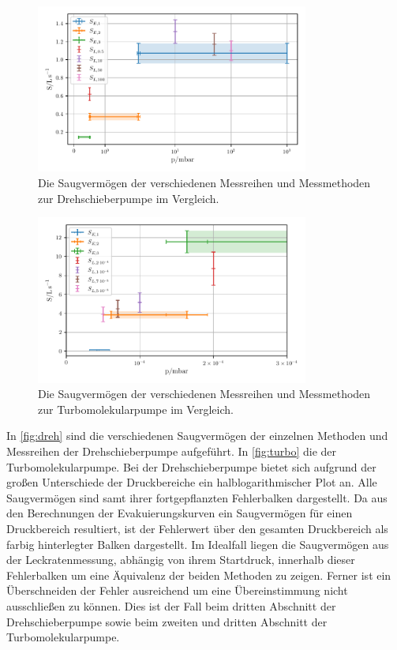 \begin{figure}
    \centering
    \includegraphics[width=0.8\textwidth]{abb/plot1.pdf}
    \caption{Die Saugvermögen der verschiedenen Messreihen und Messmethoden zur Drehschieberpumpe im Vergleich.}
    \label{fig:dreh}
\end{figure}
\begin{figure}
    \centering
    \includegraphics[width=0.8\textwidth]{abb/plot2.pdf}
    \caption{Die Saugvermögen der verschiedenen Messreihen und Messmethoden zur Turbomolekularpumpe im Vergleich.}
    \label{fig:turbo}
\end{figure}
In \autoref{fig:dreh} sind die verschiedenen Saugvermögen der einzelnen Methoden und Messreihen der Drehschieberpumpe aufgeführt.
In \autoref{fig:turbo} die der Turbomolekularpumpe. Bei der Drehschieberpumpe bietet sich aufgrund der großen Unterschiede der Druckbereiche
ein halblogarithmischer Plot an.
Alle Saugvermögen sind samt ihrer fortgepflanzten Fehlerbalken dargestellt.
Da aus den Berechnungen der Evakuierungskurven ein Saugvermögen für einen Druckbereich resultiert,
ist der Fehlerwert über den gesamten Druckbereich als farbig hinterlegter Balken dargestellt.
Im Idealfall liegen die Saugvermögen aus der Leckratenmessung, abhängig von ihrem Startdruck, innerhalb dieser Fehlerbalken um eine Äquivalenz der beiden Methoden zu zeigen.
Ferner ist ein Überschneiden der Fehler ausreichend um eine Übereinstimmung nicht ausschließen zu können.
Dies ist der Fall beim dritten Abschnitt der Drehschieberpumpe sowie beim zweiten und dritten Abschnitt der Turbomolekularpumpe.


